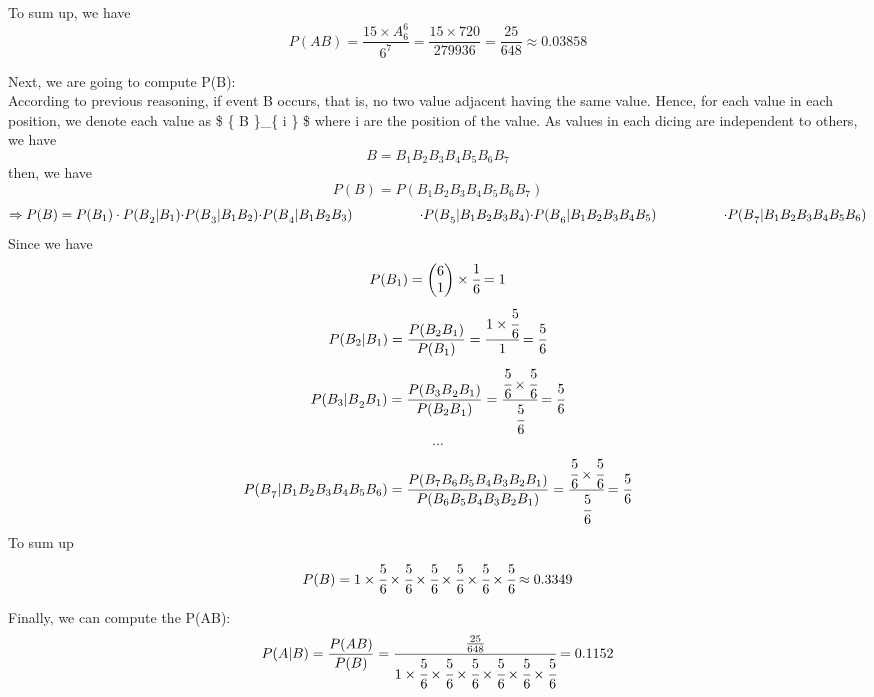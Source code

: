 \documentclass[]{article}
\begin{document}
To sum up, we have
\[ P(AB)=\frac { 15\times { A }_{ 6 }^{ 6 } }{ { 6 }^{ 7 } } =\frac { 15\times 720 }{ 279936 } =\frac { 25 }{ 648 }\approx 0.03858 \]

Next, we are going to compute P(B):\\
According to previous reasoning, if event B occurs, that is, no two
value adjacent having the same value. Hence, for each value in each
position, we denote each value as \$ \{ B \}\_\{ i \} \$ where i are the
position of the value. As values in each dicing are independent to
others, we have
\[ B={ B }_{ 1 }{ B }_{ 2 }{ B }_{ 3 }{ B }_{ 4 }{ B }_{ 5 }{ B }_{ 6 }{ B }_{ 7 } \]
then, we have
\[ P(B)=P({ B }_{ 1 }{ B }_{ 2 }{ B }_{ 3 }{ B }_{ 4 }{ B }_{ 5 }{ B }_{ 6 }{ B }_{ 7 })\]
\[ \Rightarrow P(B)=P({ B }_{ 1 }{ )\cdot P(B }_{ 2 }|{ B }_{ 1 }){ \cdot P(B }_{ 3 }|{ B }_{ 1 }{ B }_{ 2 }){ \cdot P(B }_{ 4 }|{ B }_{ 1 }{ B }_{ 2 }{ B }_{ 3 })\\ \quad \quad \quad \quad \quad { \cdot P(B }_{ 5 }|{ B }_{ 1 }{ B }_{ 2 }{ B }_{ 3 }{ B }_{ 4 }){ \cdot P(B }_{ 6 }|{ B }_{ 1 }{ B }_{ 2 }{ B }_{ 3 }{ B }_{ 4 }{ B }_{ 5 })\\ \quad \quad \quad \quad \quad { \cdot P(B }_{ 7 }|{ B }_{ 1 }{ B }_{ 2 }{ B }_{ 3 }{ B }_{ 4 }{ B }_{ 5 }{ B }_{ 6 }) \]
Since we have
\[ P({ B }_{ 1 })=\begin{pmatrix} 6 \\ 1 \end{pmatrix}\times \cfrac { 1 }{ 6 }=1 \]
\[ P({ B }_{ 2 }|{ B }_{ 1 })=\frac { P({ B }_{ 2 }{ B }_{ 1 }) }{ P({ B }_{ 1 })}=\cfrac { 1\times \cfrac { 5 }{ 6 }  }{ 1 } =\cfrac { 5 }{ 6 } \]
\[ P({ { B }_{ 3 }|B }_{ 2 }{ B }_{ 1 })=\frac { P({ { B }_{ 3 }B }_{ 2 }{ B }_{ 1 }) }{ P({ { B }_{ 2 }B }_{ 1 }) } =\cfrac { \cfrac { 5 }{ 6 } \times \cfrac { 5 }{ 6 }  }{ \cfrac { 5 }{ 6 }  } =\cfrac { 5 }{ 6 } \]
\[ \cdots \]
\[ { P(B }_{ 7 }|{ B }_{ 1 }{ B }_{ 2 }{ B }_{ 3 }{ B }_{ 4 }{ B }_{ 5 }{ B }_{ 6 })=\frac { P({ B }_{ 7 }{ { B }_{ 6 }{ B }_{ 5 } }{ B }_{ 4 }{ B }_{ 3 }{ B }_{ 2 }{ B }_{ 1 }) }{ P({ { B }_{ 6 }{ B }_{ 5 } }{ B }_{ 4 }{ B }_{ 3 }{ B }_{ 2 }{ B }_{ 1 }) } =\cfrac { \cfrac { 5 }{ 6 } \times \cfrac { 5 }{ 6 }  }{ \cfrac { 5 }{ 6 }  } =\cfrac { 5 }{ 6 } \]
To sum up
\[ { P(B })=1\times \cfrac { 5 }{ 6 } \times \cfrac { 5 }{ 6 } \times \cfrac { 5 }{ 6 } \times \cfrac { 5 }{ 6 } \times \cfrac { 5 }{ 6 } \times \cfrac { 5 }{ 6 } \approx 0.3349 \]

Finally, we can compute the P(A\textbar{}B):
\[ P(A|B)=\frac { P(AB) }{ P(B) }=\cfrac { \frac { 25 }{ 648 }  }{ 1\times \cfrac { 5 }{ 6 } \times \cfrac { 5 }{ 6 } \times \cfrac { 5 }{ 6 } \times \cfrac { 5 }{ 6 } \times \cfrac { 5 }{ 6 } \times \cfrac { 5 }{ 6 }  } = 0.1152 \]
\end{document}
